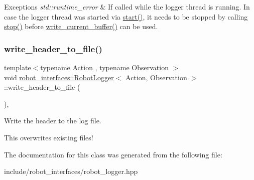 \begin{DoxyExceptions}{Exceptions}
{\em std\+::runtime\+\_\+error} & If called while the logger thread is running. In case the logger thread was started via {\ttfamily \hyperlink{classrobot__interfaces_1_1RobotLogger_a7a1b50c75aab3255ac7e6d412de833d1}{start()}}, it needs to be stopped by calling {\ttfamily \hyperlink{classrobot__interfaces_1_1RobotLogger_a55ec7dcacd849adee53fa49a2a0c8234}{stop()}} before {\ttfamily \hyperlink{classrobot__interfaces_1_1RobotLogger_a36b22a51e9615ee696a5baa350d3dee0}{write\+\_\+current\+\_\+buffer()}} can be used. \\
\hline
\end{DoxyExceptions}
\mbox{\label{classrobot__interfaces_1_1RobotLogger_a3ff864106933593e16e5f3d6b5a8c4c2}} 
\subsubsection{\texorpdfstring{write\+\_\+header\+\_\+to\+\_\+file()}{write\_header\_to\_file()}}
{\footnotesize\ttfamily template$<$typename Action , typename Observation $>$ \\
void \hyperlink{classrobot__interfaces_1_1RobotLogger}{robot\+\_\+interfaces\+::\+Robot\+Logger}$<$ Action, Observation $>$\+::write\+\_\+header\+\_\+to\+\_\+file (\begin{DoxyParamCaption}{ }\end{DoxyParamCaption})\hspace{0.3cm}{\ttfamily [inline]}, {\ttfamily [private]}}



Write the header to the log file. 

This overwrites existing files! 

The documentation for this class was generated from the following file\+:\begin{DoxyCompactItemize}
\item 
include/robot\+\_\+interfaces/robot\+\_\+logger.\+hpp\end{DoxyCompactItemize}
